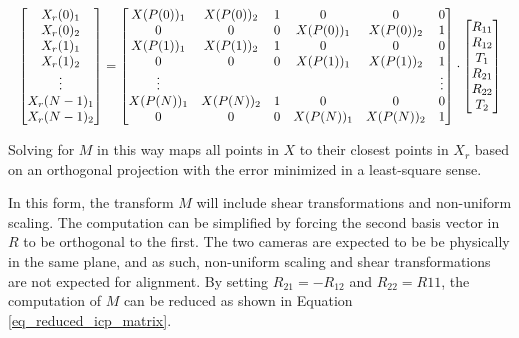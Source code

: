\documentclass[sigconf]{acmart}
\begin{document}
\begin{equation}
\resizebox{\columnwidth}{!} {$
\begin{bmatrix}
X_r(0)_1 \\
X_r(0)_2 \\
X_r(1)_1 \\
X_r(1)_2 \\
\vdots \\
X_r(N-1)_1 \\
X_r(N-1)_2
\end{bmatrix}
=
\begin{bmatrix}
X(P(0))_1 & X(P(0))_2 & 1 & 0 & 0 & 0 \\
0 & 0 & 0 & X(P(0))_1 & X(P(0))_2 & 1 \\
X(P(1))_1 & X(P(1))_2 & 1 & 0 & 0 & 0 \\
0 & 0 & 0 & X(P(1))_1 & X(P(1))_2 & 1 \\
\vdots & & & & & \vdots \\
X(P(N))_1 & X(P(N))_2 & 1 & 0 & 0 & 0 \\
0 & 0 & 0 & X(P(N))_1 & X(P(N))_2 & 1 
\end{bmatrix}
\cdot
\begin{bmatrix}
R_{11} \\
R_{12} \\
T_1 \\
R_{21} \\
R_{22} \\
T_2
\end{bmatrix}
$}
\label{eq_full_icp_matrix}
\end{equation}

Solving for $M$ in this way maps all points in $X$ to their closest points in $X_r$ based on an orthogonal projection with the error minimized in a least-square sense. 

In this form, the transform $M$ will include shear transformations and non-uniform scaling. The computation can be simplified by forcing the second basis vector in $R$ to be orthogonal to the first. The two cameras are expected to be be physically in the same plane, and as such, non-uniform scaling and shear transformations are not expected for alignment. By setting $R_{21} = -R_{12}$ and $R_{22} = R{11}$, the computation of $M$ can be reduced as shown in Equation \ref{eq_reduced_icp_matrix}.
\end{document}
